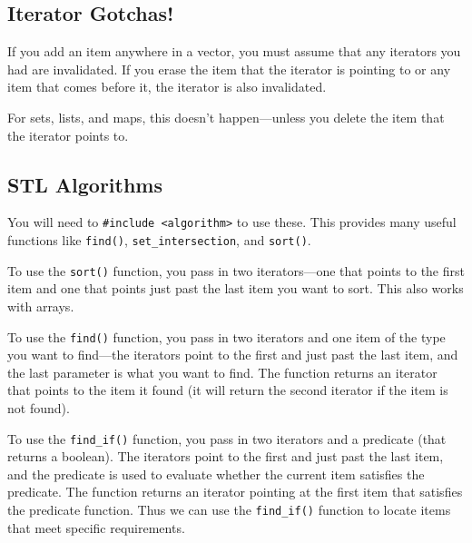 \documentclass[class=article, crop=false]{standalone}
\begin{document}
  \subsection{Iterator Gotchas!}
  If you add an item anywhere in a vector, you must assume that any iterators you had are invalidated. If you erase the item that the iterator is pointing to or any item that comes before it, the iterator is also invalidated. \par
  For sets, lists, and maps, this doesn't happen---unless you delete the item that the iterator points to.
  \subsection{STL Algorithms}
  You will need to \texttt{\#include <algorithm>} to use these. This provides many useful functions like \texttt{find()}, \texttt{set\_intersection}, and \texttt{sort()}. \par
  To use the \texttt{sort()} function, you pass in two iterators---one that points to the first item and one that points just past the last item you want to sort. This also works with arrays. \par
  To use the \texttt{find()} function, you pass in two iterators and one item of the type you want to find---the iterators point to the first and just past the last item, and the last parameter is what you want to find. The function returns an iterator that points to the item it found (it will return the second iterator if the item is not found). \par
  To use the \texttt{find\_if()} function, you pass in two iterators and a predicate (that returns a boolean). The iterators point to the first and just past the last item, and the predicate is used to evaluate whether the current item satisfies the predicate. The function returns an iterator pointing at the first item that satisfies the predicate function. Thus we can use the \texttt{find\_if()} function to locate items that meet specific requirements.
\end{document}
